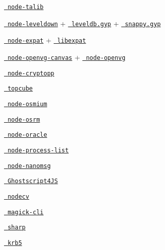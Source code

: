\begin{DoxyItemize}
\item \href{https://github.com/oransel/node-talib/blob/master/binding.gyp}{\texttt{ node-\/talib}}
\item \href{https://github.com/rvagg/node-leveldown/blob/master/binding.gyp}{\texttt{ node-\/leveldown}} + \href{https://github.com/rvagg/node-leveldown/blob/master/deps/leveldb/leveldb.gyp}{\texttt{ leveldb.\+gyp}} + \href{https://github.com/rvagg/node-leveldown/blob/master/deps/snappy/snappy.gyp}{\texttt{ snappy.\+gyp}}
\item \href{https://github.com/astro/node-expat/blob/master/binding.gyp}{\texttt{ node-\/expat}} + \href{https://github.com/astro/node-expat/blob/master/deps/libexpat/libexpat.gyp}{\texttt{ libexpat}}
\item \href{https://github.com/luismreis/node-openvg-canvas/blob/master/binding.gyp}{\texttt{ node-\/openvg-\/canvas}} + \href{https://github.com/luismreis/node-openvg/blob/master/binding.gyp}{\texttt{ node-\/openvg}}
\item \href{https://github.com/BatikhSouri/node-cryptopp/blob/master/binding.gyp}{\texttt{ node-\/cryptopp}}
\item \href{https://github.com/creationix/topcube/blob/master/binding.gyp}{\texttt{ topcube}}
\item \href{https://github.com/osmcode/node-osmium/blob/master/binding.gyp}{\texttt{ node-\/osmium}}
\item \href{https://github.com/DennisOSRM/node-osrm}{\texttt{ node-\/osrm}}
\item \href{https://github.com/joeferner/node-oracle/blob/master/binding.gyp}{\texttt{ node-\/oracle}}
\item \href{https://github.com/ReklatsMasters/node-process-list/blob/master/binding.gyp}{\texttt{ node-\/process-\/list}}
\item \href{https://github.com/nickdesaulniers/node-nanomsg/blob/master/binding.gyp}{\texttt{ node-\/nanomsg}}
\item \href{https://github.com/NickNaso/ghostscript4js/blob/master/binding.gyp}{\texttt{ Ghostscript4\+JS}}
\item \href{https://github.com/xudafeng/nodecv/blob/master/binding.gyp}{\texttt{ nodecv}}
\item \href{https://github.com/NickNaso/magick-cli/blob/master/binding.gyp}{\texttt{ magick-\/cli}}
\item \href{https://github.com/lovell/sharp/blob/master/binding.gyp}{\texttt{ sharp}}
\item \href{https://github.com/adaltas/node-krb5/blob/master/binding.gyp}{\texttt{ krb5}} 
\end{DoxyItemize}